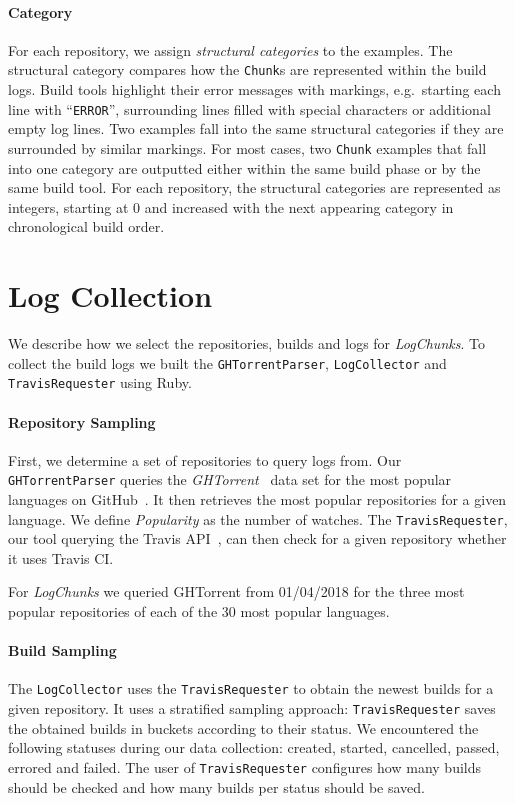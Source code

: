 \documentclass[\myrootdir/main.tex]{subfiles}
\begin{document}
\paragraph{Category}
For each repository, we assign \emph{structural categories} to the examples.
The structural category compares how the \texttt{Chunk}s are represented within the build logs.
Build tools highlight their error messages with markings, e.g.\ starting each line with ``\texttt{ERROR}'', surrounding lines filled with special characters or additional empty log lines.
Two examples fall into the same structural categories if they are surrounded by similar markings.
For most cases, two \texttt{Chunk} examples that fall into one category are outputted either within the same build phase or by the same build tool.
For each repository, the structural categories are represented as integers, starting at 0 and increased with the next appearing category in chronological build order.

\section{Log Collection}
We describe how we select the repositories, builds and logs for \emph{LogChunks}.
To collect the build logs we built the  \texttt{GHTorrentParser}, \texttt{LogCollector} and \texttt{TravisRequester} using Ruby.

\paragraph{Repository Sampling}
First, we determine a set of repositories to query logs from.
Our \texttt{GHTorrentParser} queries the \emph{GHTorrent}~\cite{gousios2013ghtorrent} data set for the most popular languages on GitHub~\cite{github2019website}.
It then retrieves the most popular repositories for a given language.
We define \emph{Popularity} as the number of watches.
The \texttt{TravisRequester}, our tool querying the Travis API~\cite{travisci2019apidoc}, can then check for a given repository whether it uses Travis CI\@.

For \emph{LogChunks} we queried GHTorrent from 01/04/2018 for the three most popular repositories of each of the 30 most popular languages.

\paragraph{Build Sampling}
The \texttt{LogCollector} uses the \texttt{TravisRequester} to obtain the newest builds for a given repository.
It uses a stratified sampling approach: \texttt{TravisRequester} saves the obtained builds in buckets according to their status.
We encountered the following statuses during our data collection: created, started, cancelled, passed, errored and failed.
The user of \texttt{TravisRequester} configures how many builds should be checked and how many builds per status should be saved.
\end{document}
